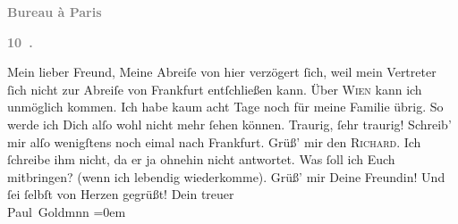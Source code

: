 \begin{ledgroupsized}[t]{13cm}
           \pstart
           \begin{otherlanguage}{french}\textcolor{gray}{\textbf{\textbf{Bureau à Paris}}}\end{otherlanguage}\pend
           \pstart
           \begin{otherlanguage}{french}\textcolor{gray}{\textbf{\textbf{10 .}}}\end{otherlanguage}\pend
           \pstart\center{}Mein lieber Freund,\pend\pstart
           Meine Abreiſe von hier
               verzögert ſich, weil mein Vertreter ſich nicht zur Abreiſe von Frankfurt entſchließen kann.\pend
           \pstart
           Über \textsc{Wien} kann ich unmöglich kommen. Ich habe kaum acht Tage noch für meine Familie
               übrig.\pend
           \pstart
           So werde ich Dich alſo wohl nicht mehr ſehen können. Traurig, ſehr traurig!\pend
           \pstart
           {\pb}Schreib’ mir alſo wenigſtens noch eimal nach Frankfurt. Grüß’ mir den \textsc{Richard}. Ich ſchreibe ihm nicht, da er ja ohnehin nicht antwortet. Was ſoll ich Euch
               mitbringen? (wenn ich lebendig wiederkomme).\pend
           \pstart
           Grüß’ mir Deine Freundin!\pend
           \pstart
           Und ſei ſelbſt von Herzen gegrüßt!\pend
           \pstart
           Dein treuer {\\[\baselineskip]}\spacefill\mbox{Paul Goldmnn}\pend
           \leftskip=0em{}
         
         \endnumbering{}\end{ledgroupsized}  \newcommand{\dateiname}{L02843}\newcommand{\titel}{Paul Goldmann an Arthur Schnitzler, 16. 3. [1898]}\newcommand{\editorInnen}{Martin Anton Müller und Laura Untner}
      